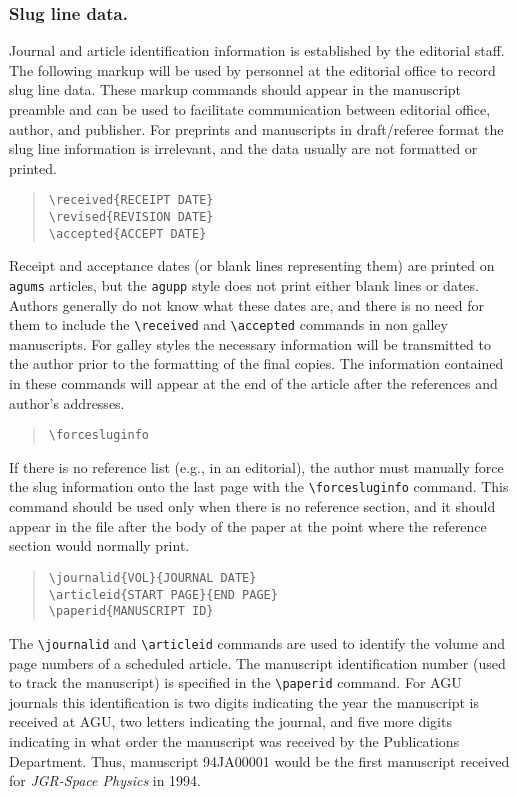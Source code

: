 \subsubsection{Slug line data.}
Journal and article identification information is established by the 
editorial staff.  The following markup will be used by personnel at 
the editorial office to record slug line data.  These markup commands 
should appear in the manuscript preamble and can be used to facilitate 
communication between editorial office, author, and publisher.  For 
preprints and manuscripts in draft/referee format the slug line
information is irrelevant, and the data usually are not formatted 
or printed.
\begin{quote}
\verb"\received{RECEIPT DATE}"\\
\verb"\revised{REVISION DATE}"\\
\verb"\accepted{ACCEPT DATE}"
\end{quote}
Receipt and acceptance dates (or blank lines representing them) are 
printed on {\tt agums} articles, but the {\tt agupp} style does not 
print either blank lines or dates.  Authors generally do not know 
what these dates are, and there is no need for them to include the 
\verb"\received" and \verb"\accepted" commands in non galley 
manuscripts.  For galley styles the necessary information will be 
transmitted to the author prior to the formatting of the final copies.  
The information contained in these commands will appear at the end of 
the article after the references and author's addresses.  

\begin{quote}
\verb"\forcesluginfo"
\end{quote}

If there is no reference list (e.g., in an editorial), the author 
must manually force the slug information onto the last page with the 
\verb"\forcesluginfo" command.  This command should be used only when 
there is no reference section, and it should appear in the file after 
the body of the paper at the point where the reference section would 
normally print.

\begin{quote}
\verb"\journalid{VOL}{JOURNAL DATE}"\\
\verb"\articleid{START PAGE}{END PAGE}"\\
\verb"\paperid{MANUSCRIPT ID}"
\end{quote}

The \verb"\journalid" and \verb"\articleid" commands are used 
to identify the volume and page numbers of a scheduled article.  
The manuscript identification number (used to track the manuscript)
is specified in the \verb"\paperid" command.  For AGU journals this 
identification is two digits indicating the year the manuscript is
received at AGU, two letters indicating the journal, and five more 
digits indicating in what order the manuscript was received by the
Publications Department.  Thus, manuscript 94JA00001 would be the 
first manuscript received for {\it JGR-Space Physics} in 1994.

